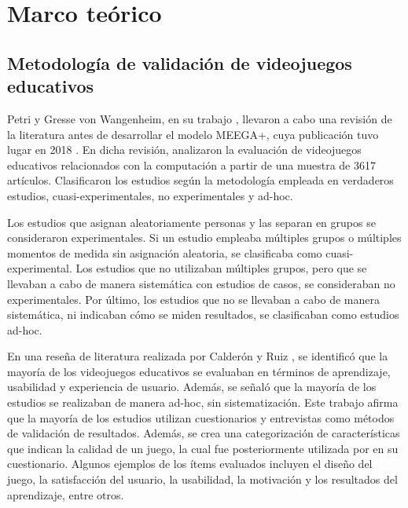 \section{Marco teórico}

\subsection{Metodología de validación de videojuegos educativos}

Petri y Gresse von Wangenheim, en su trabajo \cite{HowGamesComputingEducationEvaluated}, llevaron a cabo una revisión de la literatura antes de desarrollar el modelo MEEGA+, cuya publicación tuvo lugar en 2018 \cite{meegaplus}. En dicha revisión, analizaron la evaluación de videojuegos educativos relacionados con la computación a partir de una muestra de 3617 artículos. Clasificaron los estudios según la metodología empleada en verdaderos estudios, cuasi-experimentales, no experimentales y ad-hoc.

Los estudios que asignan aleatoriamente personas y las separan en grupos se consideraron experimentales. Si un estudio empleaba múltiples grupos o múltiples momentos de medida sin asignación aleatoria, se clasificaba como cuasi-experimental. Los estudios que no utilizaban múltiples grupos, pero que se llevaban a cabo de manera sistemática con estudios de casos, se consideraban no experimentales. Por último, los estudios que no se llevaban a cabo de manera sistemática, ni indicaban cómo se miden resultados, se clasificaban como estudios ad-hoc.

En una reseña de literatura realizada por Calderón y Ruiz \cite{CalderonRuizReviewSeriousGamesEvaluation}, se identificó que la mayoría de los videojuegos educativos se evaluaban en términos de aprendizaje, usabilidad y experiencia de usuario. Además, se señaló que la mayoría de los estudios se realizaban de manera ad-hoc, sin sistematización. Este trabajo afirma que la mayoría de los estudios utilizan cuestionarios y entrevistas como métodos de validación de resultados. Además, se crea una categorización de características que indican la calidad de un juego, la cual fue posteriormente utilizada por \cite{meegaplus} en su cuestionario. Algunos ejemplos de los ítems evaluados incluyen el diseño del juego, la satisfacción del usuario, la usabilidad, la motivación y los resultados del aprendizaje, entre otros.

